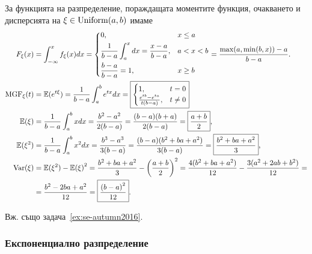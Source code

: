 \documentclass[numbers=endperiod, DIV=15, bibliography=totocnumbered]{scrartcl}
\begin{document}
За функцията на разпределение, пораждащата моментите функция, очакването и дисперсията на $\xi \in \operatorname{Uniform}(a, b)$ имаме
\begingroup
\allowdisplaybreaks
\begin{align*}
  F_\xi(x)
  &=
  \int_{-\infty}^x f_\xi(x) dx
  =
  \begin{dcases}
    0, &x \leq a \\
    \frac 1 {b-a} \int_a^x dx = \frac {x-a} {b-a}, &a < x < b \\
    \frac {b-a} {b-a} = 1, &x \geq b
  \end{dcases}
  =
  \frac {\max(a, \min(b, x))-a} {b-a}.
  \\
  \operatorname{MGF}_\xi(t)
  &=
  \mathbb{E}(e^{t\xi})
  =
  \frac 1 {b-a} \int_a^b e^{tx} dx
  =
  \boxed{\begin{cases}
    1, &t = 0 \\
    \frac {e^{tb} - e^{ta}} {t(b-a)}, &t \neq 0
  \end{cases}}
  \\
  \mathbb{E}(\xi)
  &=
  \frac 1 {b-a} \int_a^b x dx
  =
  \frac {b^2 - a^2} {2(b-a)}
  =
  \frac {(b-a)(b+a)} {2(b-a)}
  =
  \boxed{\frac {a + b} 2},
  \\
  \mathbb{E}(\xi^2)
  &=
  \frac 1 {b-a} \int_a^b x^2 dx
  =
  \frac {b^3 - a^3} {3(b-a)}
  =
  \frac {(b-a)(b^2+ba+a^2)} {3(b-a)}
  =
  \boxed{\frac {b^2+ba+a^2} 3},
  \\
  \operatorname{Var}(\xi)
  &=
  \mathbb{E}(\xi^2) - {\mathbb{E}(\xi)}^2
  =
  \frac {b^2+ba+a^2} 3 - {\left(\frac {a+b} 2 \right)}^2
  =
  \frac {4(b^2+ba+a^2)} {12} - \frac {3 (a^2+2ab+b^2)} {12}
  = \\ &=
  \frac {b^2-2ba+a^2} {12}
  =
  \boxed{\frac {{(b-a)}^2} {12}}.
\end{align*}
\endgroup

Вж. също задача~\ref{ex:se-autumn2016}.

\subsubsection{Експоненциално разпределение}\label{dist:exp}
\end{document}
